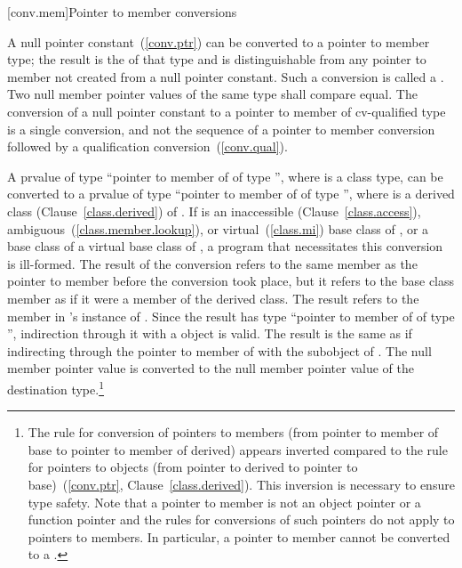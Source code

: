 [conv.mem]{Pointer to member conversions}

\pnum
{}%
%
%
A null pointer constant~(\ref{conv.ptr}) can be converted to a pointer
to member type; the result is the 
of that type and is distinguishable from any pointer to member not
created from a null pointer constant.
Such a conversion is called a .
Two null member pointer values of
the same type shall compare equal. The conversion of a null pointer
constant to a pointer to member of cv-qualified type is a single
conversion, and not the sequence of a pointer to member conversion
followed by a qualification conversion~(\ref{conv.qual}).

\pnum
A prvalue of type ``pointer to member of  of type 
'', where  is a class type, can be converted to
a prvalue of type ``pointer to member of  of type 
'', where  is a derived class
(Clause~\ref{class.derived}) of . If  is an
inaccessible (Clause~\ref{class.access}),
ambiguous~(\ref{class.member.lookup}), or virtual~(\ref{class.mi}) base
class of , or a base class of a virtual base class of
, a program that necessitates this conversion is ill-formed.
The result of the conversion refers to the same member as the pointer to
member before the conversion took place, but it refers to the base class
member as if it were a member of the derived class. The result refers to
the member in 's instance of . Since the result has
type ``pointer to member of  of type  '',
indirection through it with a  object is valid. The result is the same
as if indirecting through the pointer to member of  with the
 subobject of . The null member pointer value is
converted to the null member pointer value of the destination
type.\footnote{The rule for conversion of pointers to members (from pointer to member
of base to pointer to member of derived) appears inverted compared to
the rule for pointers to objects (from pointer to derived to pointer to
base)~(\ref{conv.ptr}, Clause~\ref{class.derived}). This inversion is
necessary to ensure type safety. Note that a pointer to member is not
an object pointer or a function pointer
and the rules for conversions
of such pointers do not apply to pointers to members.
%
In particular, a pointer to member cannot be converted to a
.}

